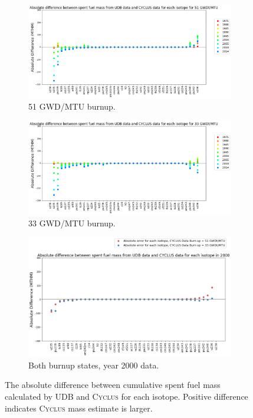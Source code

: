 \documentclass{anstrans}
\newcommand{\Cyclus}{\textsc{Cyclus}\xspace}%
\begin{document}
\begin{figure}[htb] %
	\centering
        \begin{subfigure}{0.9\textwidth}
        \includegraphics[height=0.30\textheight]{figures/absolute_diff_all_51}
        \caption{51 GWD/MTU burnup.}
	\label{fig:absolute_diff_all_51}
        \end{subfigure}
        \begin{subfigure}{0.9\textwidth}
        \includegraphics[height=0.30\textheight]{figures/absolute_diff_all_33}
        \caption{33 GWD/MTU burnup.}
	\label{fig:absolute_diff_all_33}
        \end{subfigure}
        \begin{subfigure}{0.9\textwidth}
        \includegraphics[height=0.35\textheight]{figures/absolute_diff_2000}
        \caption{Both burnup states, year 2000 data.}
	\label{fig:absolute_diff_2000}
        \end{subfigure}
        \caption{The absolute difference between cumulative spent fuel mass calculated by 
        \gls{UDB} and \Cyclus for each isotope. Positive difference indicates \Cyclus 
        mass estimate is larger.}
        \label{fig:absolute}
\end{figure} 
\FloatBarrier
\end{document}
